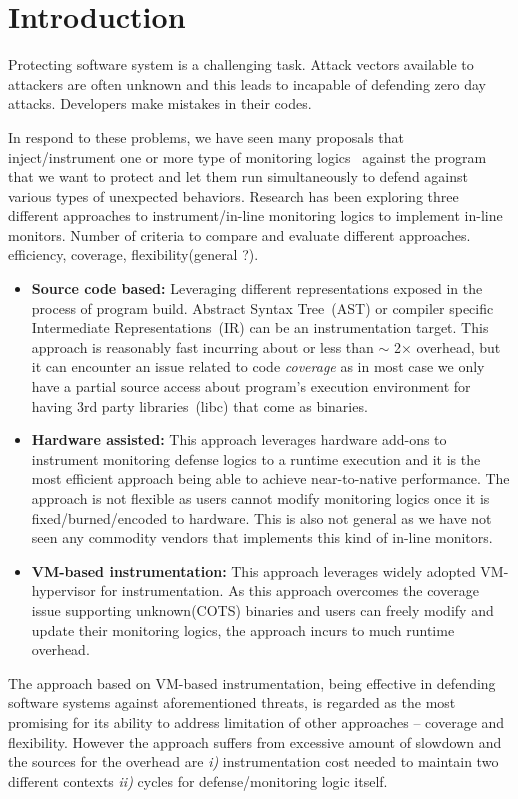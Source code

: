 \section{Introduction} \label{sec:intro}

Protecting software system is a challenging task. 
%
Attack vectors available to attackers are often unknown and this leads to
incapable of defending zero day attacks.
%
Developers make mistakes in their codes.

%
In respond to these problems, we have seen many proposals that
inject/instrument one or more type of monitoring logics~\cite{cfi, memcheck,
dft} against the program that we want to protect and let them run
simultaneously to defend against various types of unexpected behaviors.
%
Research has been exploring three different approaches to instrument/in-line
monitoring logics to implement in-line monitors.
%
Number of criteria to compare and evaluate different approaches. efficiency,
coverage, flexibility(general ?).

\begin{itemize}
%
    \item {\bf Source code based:} Leveraging different representations exposed
in the process of program build. Abstract Syntax Tree~(AST) or compiler
specific Intermediate Representations~(IR) can be an instrumentation target.
This approach is reasonably fast incurring about or less than $\sim$ 2$\times$
overhead, but it can encounter an issue related to code {\it coverage} as in
most case we only have a partial source access about program's execution
environment for having 3rd party libraries~(\ie libc) that come as binaries.
%
    \item {\bf Hardware assisted:} This approach leverages hardware add-ons to
instrument monitoring defense logics to a runtime execution and it is the most
efficient approach being able to achieve near-to-native performance. The
approach is not flexible as users cannot modify monitoring logics once it is
fixed/burned/encoded to hardware. This is also not general as we have not seen
any commodity vendors that implements this kind of in-line monitors.
%
    \item {\bf VM-based instrumentation:}  This approach leverages widely
adopted VM-hypervisor for instrumentation. As this approach overcomes the
coverage issue supporting unknown(COTS) binaries and users can freely modify
and update their monitoring logics, the approach incurs to much runtime
overhead.

\end{itemize}
%
The approach based on VM-based instrumentation, being effective in defending
software systems against aforementioned threats, is regarded as the most
promising for its ability to address limitation of other approaches -- coverage
and flexibility. 
%
However the approach suffers from excessive amount of slowdown and the sources
for the overhead are {\it i)} instrumentation cost needed to maintain two
different contexts {\it ii)} cycles for defense/monitoring logic itself.
%

